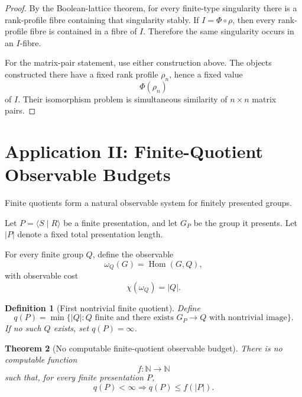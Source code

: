 \documentclass[11pt]{article}
\newtheorem{theorem}{Theorem}[section]
\newtheorem{definition}[theorem]{Definition}
\DeclareMathOperator{\Hom}{Hom}
\begin{document}
\begin{proof}
By the Boolean-lattice theorem, for every finite-type singularity there is a rank-profile fibre containing that singularity stably. If \(I=\Phi\circ\rho\), then every rank-profile fibre is contained in a fibre of \(I\). Therefore the same singularity occurs in an \(I\)-fibre.

For the matrix-pair statement, use either construction above. The objects constructed there have a fixed rank profile \(\rho_n\), hence a fixed value
\[
\Phi(\rho_n)
\]
of \(I\). Their isomorphism problem is simultaneous similarity of \(n\times n\) matrix pairs.
\end{proof}

\section{Application II: Finite-Quotient Observable Budgets}

Finite quotients form a natural observable system for finitely presented groups.

Let \(P=\langle S\mid R\rangle\) be a finite presentation, and let \(G_P\) be the group it presents. Let \(|P|\) denote a fixed total presentation length.

For every finite group \(Q\), define the observable
\[
\omega_Q(G)=\Hom(G,Q),
\]
with observable cost
\[
\chi(\omega_Q)=|Q|.
\]

\begin{definition}[First nontrivial finite quotient]
Define
\[
q(P)=
\min\{|Q|:Q\text{ finite and there exists }G_P\to Q
\text{ with nontrivial image}\}.
\]
If no such \(Q\) exists, set \(q(P)=\infty\).
\end{definition}

\begin{theorem}[No computable finite-quotient observable budget]
There is no computable function
\[
f:\mathbb N\to\mathbb N
\]
such that, for every finite presentation \(P\),
\[
q(P)<\infty\Longrightarrow q(P)\leq f(|P|).
\]
\end{theorem}
\end{document}
